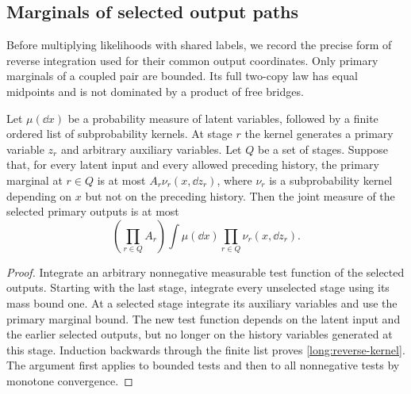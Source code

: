 \subsection{Marginals of selected output paths}

Before multiplying likelihoods with shared labels, we record the precise
form of reverse integration used for their common output coordinates.
Only primary marginals of a coupled pair are bounded.  Its full two-copy
law has equal midpoints and is not dominated by a product of free bridges.

\begin{lemma}\label{long:kernel}
Let $\mu(\dd x)$ be a probability measure of latent variables, followed by
a finite ordered list of subprobability kernels.  At stage $r$ the kernel
generates a primary variable $z_r$ and arbitrary auxiliary variables.  Let
$Q$ be a set of stages.  Suppose that, for every latent input and every
allowed preceding history, the primary marginal at $r\in Q$ is at most
$A_r\nu_r(x,\dd z_r)$, where $\nu_r$ is a subprobability kernel depending
on $x$ but not on the preceding history.  Then the joint measure of the
selected primary outputs is at most
\begin{equation}\label{long:reverse-kernel}
       \left(\prod_{r\in Q}A_r\right)
                   \int\mu(\dd x)\prod_{r\in Q}\nu_r(x,\dd z_r).
\end{equation}
\end{lemma}
\begin{proof}
Integrate an arbitrary nonnegative measurable test function of the selected
outputs.  Starting with the last stage, integrate every unselected stage
using its mass bound one.  At a selected stage integrate its auxiliary
variables and use the primary marginal bound.  The new test function
depends on the latent input and the earlier selected outputs, but no
longer on the history variables generated at this stage.  Induction
backwards through the finite list proves \eqref{long:reverse-kernel}.
The argument first applies to bounded tests and then to all nonnegative
tests by monotone convergence.
\end{proof}

